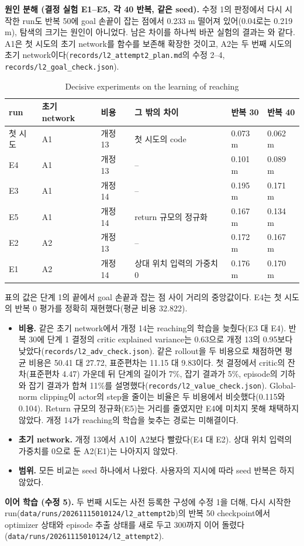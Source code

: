 \documentclass[11pt]{article}\usepackage[margin=1in]{geometry}\usepackage{amsmath,amssymb,amsthm,mathtools}\usepackage{graphicx}\graphicspath{{figures/}{../figures/}{figs/}{./}}\usepackage{enumitem}\usepackage{hyperref}\usepackage{cleveref}\usepackage{tikz}\usetikzlibrary{arrows.meta,positioning,calc,shapes.geometric}\usepackage{float}\usepackage{rotating}\usepackage[most]{tcolorbox}\usepackage{kotex}\usepackage{booktabs}\usepackage{longtable}\emergencystretch=1.6em\tolerance=2000 \crefname{assumption}{Assumption}{Assumptions}\Crefname{assumption}{Assumption}{Assumptions}\crefname{definition}{Definition}{Definitions}\Crefname{definition}{Definition}{Definitions}\crefname{proposition}{Proposition}{Propositions}\Crefname{proposition}{Proposition}{Propositions}\crefname{fact}{Fact}{Facts}\Crefname{fact}{Fact}{Facts} \newtheorem{assumption}{Assumption}\newtheorem{definition}{Definition}\newtheorem{lemma}{Lemma}\newtheorem{proposition}{Proposition}\newtheorem{theorem}{Theorem}\newtheorem{corollary}{Corollary}\newtheorem{fact}{Fact}\theoremstyle{remark}\newtheorem{remark}{Remark} \newcommand{\R}{\mathbb{R}}\newcommand{\xb}{\bar x}\newcommand{\Ab}{\bar A}\newcommand{\By}{\bar B_y}\newcommand{\U}{\mathcal U}\newcommand{\Z}{\mathcal Z}
\begin{document}
\textbf{원인 분해 (결정 실험 E1--E5, 각 40 반복, 같은 seed).} 수정 1의 판정에서 다시 시작한 run도 반복 50에 goal 손끝이 잡는 점에서 0.233 m 떨어져 있어(0.04로는 0.219 m), 탐색의 크기는 원인이 아니었다. 남은 차이를 하나씩 바꾼 실험의 결과는 와 같다. A1은 첫 시도의 초기 network를 함수를 보존해 확장한 것이고, A2는 두 번째 시도의 초기 network이다(\texttt{records/l2\_attempt2\_plan.md}의 수정 2--4, \texttt{records/l2\_goal\_check.json}).

\begin{table}[H]
\centering\footnotesize
\caption{Decisive experiments on the learning of reaching}
\label{tab:l2diag}
\begin{tabular}{p{3.2cm}p{2.0cm}p{1.4cm}p{3.6cm}p{1.3cm}p{1.3cm}}
\toprule
run & 초기 network & 비용 & 그 밖의 차이 & 반복 30 & 반복 40 \\
\midrule
첫 시도 & A1 & 개정 13 & 첫 시도의 code & 0.073 m & 0.062 m \\
E4 & A1 & 개정 13 & -- & 0.101 m & 0.089 m \\
E3 & A1 & 개정 14 & -- & 0.195 m & 0.171 m \\
E5 & A1 & 개정 14 & return 규모의 정규화 & 0.167 m & 0.134 m \\
E2 & A2 & 개정 13 & -- & 0.172 m & 0.167 m \\
E1 & A2 & 개정 14 & 상대 위치 입력의 가중치 0 & 0.176 m & 0.170 m \\
\bottomrule
\end{tabular}
\end{table}

표의 값은 단계 1의 끝에서 goal 손끝과 잡는 점 사이 거리의 중앙값이다. E4는 첫 시도의 반복 0 평가를 정확히 재현했다(평균 비용 32.822).
\begin{itemize}
\item \textbf{비용.} 같은 초기 network에서 개정 14는 reaching의 학습을 늦췄다(E3 대 E4). 반복 30에 단계 1 결정의 critic explained variance는 0.63으로 개정 13의 0.95보다 낮았다(\texttt{records/l2\_adv\_check.json}). 같은 rollout을 두 비용으로 채점하면 평균 비용은 50.41 대 27.72, 표준편차는 11.15 대 9.83이다. 첫 결정에서 critic의 잔차(표준편차 4.47) 가운데 뒤 단계의 길이가 7\%, 잡기 결과가 5\%, episode의 기하와 잡기 결과가 합쳐 11\%를 설명했다(\texttt{records/l2\_value\_check.json}). Global-norm clipping이 actor의 step을 줄이는 비율은 두 비용에서 비슷했다(0.115와 0.104). Return 규모의 정규화(E5)는 거리를 줄였지만 E4에 미치지 못해 채택하지 않았다. 개정 14가 reaching의 학습을 늦추는 경로는 미해결이다.
\item \textbf{초기 network.} 개정 13에서 A1이 A2보다 빨랐다(E4 대 E2). 상대 위치 입력의 가중치를 0으로 둔 A2(E1)는 나아지지 않았다.
\item \textbf{범위.} 모든 비교는 seed 하나에서 나왔다. 사용자의 지시에 따라 seed 반복은 하지 않았다.
\end{itemize}
\textbf{이어 학습 (수정 5).} 두 번째 시도는 사전 등록한 구성에 수정 1을 더해, 다시 시작한 run(\texttt{data/runs/20261115010124/l2\_attempt2b})의 반복 50 checkpoint에서 optimizer 상태와 episode 추출 상태를 새로 두고 300까지 이어 돌렸다(\texttt{data/runs/20261115010124/l2\_attempt2}).
\end{document}
